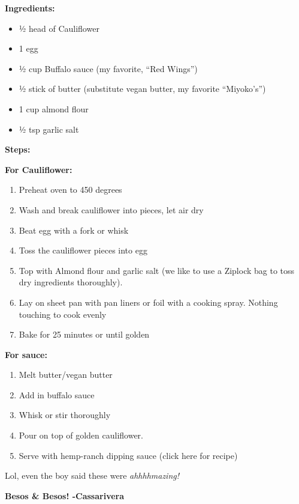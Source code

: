 \documentclass[]{book}
\providecommand{\tightlist}{%
  \setlength{\itemsep}{0pt}\setlength{\parskip}{0pt}}
\begin{document}
\textbf{\textbf{Ingredients:}}

\begin{itemize}
\tightlist
\item
  ½ head of Cauliflower
\item
  1 egg
\item
  ½ cup Buffalo sauce (my favorite, ``Red Wings'')
\item
  ½ stick of butter (substitute vegan butter, my favorite ``Miyoko's'')
\item
  1 cup almond flour
\item
  ½ tsp garlic salt
\end{itemize}

\textbf{\textbf{Steps:}}

\textbf{For Cauliflower:}

\begin{enumerate}
\def\labelenumi{\arabic{enumi}.}
\tightlist
\item
  Preheat oven to 450 degrees
\item
  Wash and break cauliflower into pieces, let air dry
\item
  Beat egg with a fork or whisk
\item
  Toss the cauliflower pieces into egg
\item
  Top with Almond flour and garlic salt (we like to use a Ziplock bag to
  toss dry ingredients thoroughly).\\
\item
  Lay on sheet pan with pan liners or foil with a cooking spray. Nothing
  touching to cook evenly
\item
  Bake for 25 minutes or until golden
\end{enumerate}

\textbf{For sauce:}

\begin{enumerate}
\def\labelenumi{\arabic{enumi}.}
\tightlist
\item
  Melt butter/vegan butter
\item
  Add in buffalo sauce
\item
  Whisk or stir thoroughly
\item
  Pour on top of golden cauliflower.
\item
  Serve with hemp-ranch dipping sauce (click here for recipe)
\end{enumerate}

Lol, even the boy said these were \emph{ahhhhmazing!}

\textbf{Besos \& Besos! -Cassarivera}
\end{document}
